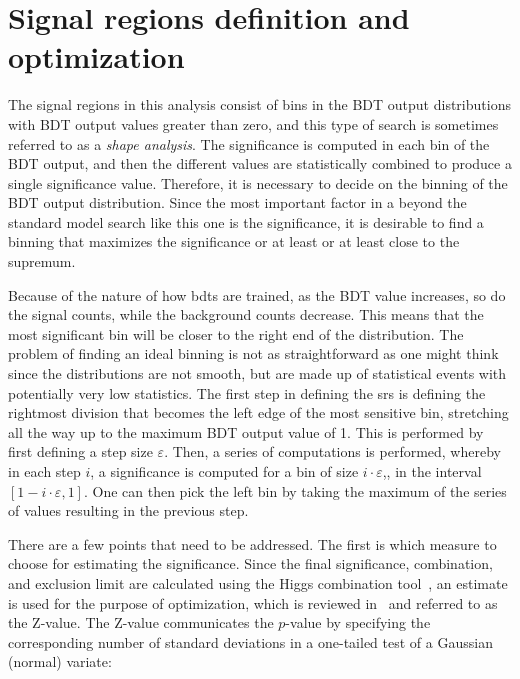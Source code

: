 \clearpage
\section{Signal regions definition and optimization}
\label{sec:signal-regions}

The signal regions in this analysis consist of bins in the BDT output distributions with BDT output values greater than zero, and this type of search is sometimes referred to as a \emph{shape analysis}. The significance is computed in each bin of the BDT output, and then the different values are statistically combined to produce a single significance value. Therefore, it is necessary to decide on the binning of the BDT output distribution. Since the most important factor in a beyond the standard model search like this one is the significance, it is desirable to find a binning that maximizes the significance or at least or at least close to the supremum. 

Because of the nature of how \glspl{bdt} are trained, as the BDT value increases, so do the signal counts, while the background counts decrease. This means that the most significant bin will be closer to the right end of the distribution. The problem of finding an ideal binning is not as straightforward as one might think since the distributions are not smooth, but are made up of statistical events with potentially very low statistics. The first step in defining the \glspl{sr} is defining the rightmost division that becomes the left edge of the most sensitive bin, stretching all the way up to the maximum BDT output value of 1. This is performed by first defining a step size $\varepsilon$. Then, a series of computations is performed, whereby in each step $i$, a significance is computed for a bin of size $i\cdot \varepsilon$,\ie, in the interval $\left[ 1-i\cdot \varepsilon, 1 \right]$. One can then pick the left bin by taking the maximum of the series of values resulting in the previous step.

There are a few points that need to be addressed. The first is which measure to choose for estimating the significance. Since the final significance, combination, and exclusion limit are calculated using the Higgs combination tool~\cite{higgs-combine-site}, an estimate is used for the purpose of optimization, which is reviewed in~\cite{pvalue,Cousins:2007bmb} and referred to as the Z-value. The Z-value communicates the $p$-value by specifying the corresponding number of standard deviations in a one-tailed test of a Gaussian (normal) variate:

